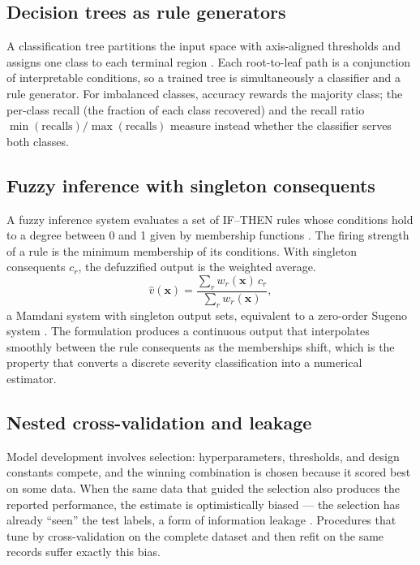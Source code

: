 \subsection{Decision trees as rule generators}

A classification tree partitions the input space with axis-aligned thresholds and assigns one class to each terminal region \cite{breiman1984cart}. Each root-to-leaf path is a conjunction of interpretable conditions, so a trained tree is simultaneously a classifier and a rule generator. For imbalanced classes, accuracy rewards the majority class; the per-class recall (the fraction of each class recovered) and the recall ratio $\min(\mathrm{recalls})/\max(\mathrm{recalls})$ measure instead whether the classifier serves both classes. 

\subsection{Fuzzy inference with singleton consequents}

A fuzzy inference system evaluates a set of IF--THEN rules whose conditions hold to a degree between 0 and 1 given by membership functions \cite{zadeh1965fuzzy,mamdani1975experiment}. The firing strength of a rule is the minimum membership of its conditions. With singleton consequents $c_r$, the defuzzified output is the weighted average.
\begin{equation}
  \hat{v}(\mathbf{x}) =
  \frac{\sum_{r} w_r(\mathbf{x})\, c_r}{\sum_{r} w_r(\mathbf{x})},
  \label{eq:fis}
\end{equation}
a Mamdani system with singleton output sets, equivalent to a zero-order Sugeno system \cite{takagi1985fuzzy}. The formulation produces a continuous output that interpolates smoothly between the rule consequents as the memberships shift, which is the property that converts a discrete severity classification into a numerical estimator.

\subsection{Nested cross-validation and leakage}
\label{sec:nested}

Model development involves selection: hyperparameters, thresholds, and design constants compete, and the winning combination is chosen because it scored best on some data. When the same data that guided the selection also produces the reported performance, the estimate is optimistically biased --- the selection has already ``seen'' the test labels, a form of information leakage \cite{varma2006bias,cawley2010overfitting}. Procedures that tune by cross-validation on the complete dataset and then refit on the same records suffer exactly this bias.

